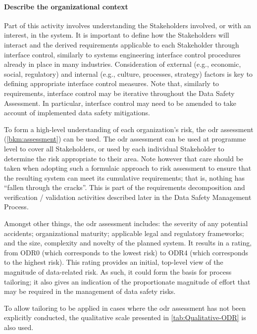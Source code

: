 \paragraph{Describe the organizational context}
Part of this activity involves understanding the Stakeholders involved, or with an interest, in the system. It is important to define how the Stakeholders will interact and the derived requirements applicable to each Stakeholder through interface control, similarly to systems engineering interface control procedures already in place in many industries. Consideration of external (e.g., economic, social, regulatory) and internal (e.g., culture, processes, strategy) factors is key to defining appropriate interface control measures. Note that, similarly to requirements, interface control may be iterative throughout the Data Safety Assessment. In particular, interface control may need to be amended to take account of implemented data safety mitigations.

To form
a high-level understanding of each organization's risk,
the \gls{odr} assessment (\autoref{bkm:assessment}) can be used. The \gls{odr} assessment can be used at programme level to cover all Stakeholders, or used by each individual Stakeholder to determine the
risk
appropriate to their area.
Note however that care should be taken when adopting such a formulaic approach to risk assessment
to ensure that the resulting system can meet its cumulative requirements; that is, nothing has ``fallen through the cracks''. This is part of the requirements decomposition and verification / validation activities described later in the Data Safety Management Process.

Amongst other things, the \gls{odr} assessment includes: the severity of any potential accidents; organizational maturity; applicable legal and regulatory frameworks; and the size, complexity and novelty of the planned system. It results in a rating, from ODR0 (which corresponds to the lowest risk) to ODR4 (which corresponds to the highest risk). This rating provides an initial, top-level view of the magnitude of data-related risk. As such, it
could form
the basis for process tailoring; it also
gives an indication of the proportionate magnitude of effort that may be required in the management of data safety risks.

To allow tailoring to be applied in cases where the \gls{odr} assessment has not been explicitly conducted, the qualitative scale presented in \autoref{tab:Qualitative-ODR} is also used.


